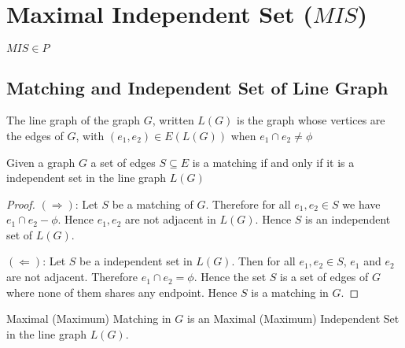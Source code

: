 \section{Maximal Independent Set ($MIS$)}
\begin{theorem}
	$MIS\in P$
\end{theorem}

\subsection{Matching and Independent Set of Line Graph}

\begin{definition}
	The line graph of the graph $G$, written $L(G)$  is the graph whose vertices are the edges of $G$, with $(e_1,e_2)\in E(L(G))$ when $e_1\cap e_2\neq \phi$
\end{definition}

\begin{theorem}
	Given a graph $G$ a set of edges $S\subseteq E$ is a matching if and only if it is a independent set in the line graph $L(G)$
\end{theorem}
\begin{proof}
	$(\Rightarrow)$: Let $S$ be a matching of $G$. Therefore for all $e_1,e_2\in S$ we have $e_1\cap e_2-\phi$. Hence $e_1,e_2$ are not adjacent in $L(G)$. Hence $S$ is an independent set of $L(G)$.
	
	$(\Leftarrow)$: Let $S$ be a independent set in $L(G)$. Then for all $e_1,e_2\in S$, $e_1$ and $e_2$ are not adjacent. Therefore $e_1\cap e_2=\phi$. Hence the set $S$ is a set of edges of $G$ where none of them shares any endpoint. Hence $S$ is a matching in $G$.
\end{proof}

\begin{fact}
	Maximal (Maximum) Matching in $G$ is an Maximal (Maximum) Independent Set  in the line graph $L(G)$.
\end{fact}

